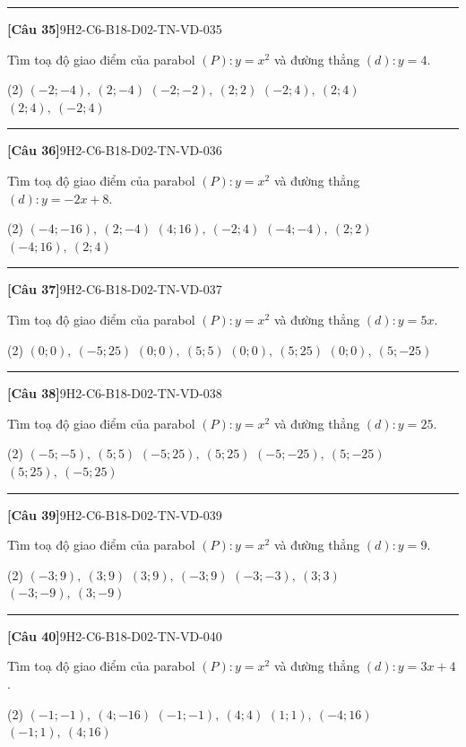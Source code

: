 \documentclass[12pt,a4paper]{article}
\newif\ifloigiai
\newenvironment{cauhoi}[2]{%
  \par\medskip\noindent\rule{\textwidth}{0.4pt}\par\nopagebreak
  \noindent\textbf{[#1]}\hfill{\scriptsize\ttfamily #2}\par\nopagebreak\smallskip}{\par}
\newcommand{\dapan}[1]{\ifloigiai\par\smallskip\noindent\textit{Đáp án:} \textbf{#1}\par\fi}
\begin{document}
\begin{cauhoi}{Câu 35}{9H2-C6-B18-D02-TN-VD-035}
Tìm toạ độ giao điểm của parabol $(P): y=x^{2}$ và đường thẳng $(d): y=4$.
\begin{tasks}(2)
\task $(-2;-4),\ (2;-4)$
\task $(-2;-2),\ (2;2)$
\task $(-2;4),\ (2;4)$
\task $(2;4),\ (-2;4)$
\end{tasks}
\dapan{C}
\end{cauhoi}
\begin{cauhoi}{Câu 36}{9H2-C6-B18-D02-TN-VD-036}
Tìm toạ độ giao điểm của parabol $(P): y=x^{2}$ và đường thẳng $(d): y=-2x+8$.
\begin{tasks}(2)
\task $(-4;-16),\ (2;-4)$
\task $(4;16),\ (-2;4)$
\task $(-4;-4),\ (2;2)$
\task $(-4;16),\ (2;4)$
\end{tasks}
\dapan{D}
\end{cauhoi}
\begin{cauhoi}{Câu 37}{9H2-C6-B18-D02-TN-VD-037}
Tìm toạ độ giao điểm của parabol $(P): y=x^{2}$ và đường thẳng $(d): y=5x$.
\begin{tasks}(2)
\task $(0;0),\ (-5;25)$
\task $(0;0),\ (5;5)$
\task $(0;0),\ (5;25)$
\task $(0;0),\ (5;-25)$
\end{tasks}
\dapan{C}
\end{cauhoi}
\begin{cauhoi}{Câu 38}{9H2-C6-B18-D02-TN-VD-038}
Tìm toạ độ giao điểm của parabol $(P): y=x^{2}$ và đường thẳng $(d): y=25$.
\begin{tasks}(2)
\task $(-5;-5),\ (5;5)$
\task $(-5;25),\ (5;25)$
\task $(-5;-25),\ (5;-25)$
\task $(5;25),\ (-5;25)$
\end{tasks}
\dapan{B}
\end{cauhoi}
\begin{cauhoi}{Câu 39}{9H2-C6-B18-D02-TN-VD-039}
Tìm toạ độ giao điểm của parabol $(P): y=x^{2}$ và đường thẳng $(d): y=9$.
\begin{tasks}(2)
\task $(-3;9),\ (3;9)$
\task $(3;9),\ (-3;9)$
\task $(-3;-3),\ (3;3)$
\task $(-3;-9),\ (3;-9)$
\end{tasks}
\dapan{A}
\end{cauhoi}
\begin{cauhoi}{Câu 40}{9H2-C6-B18-D02-TN-VD-040}
Tìm toạ độ giao điểm của parabol $(P): y=x^{2}$ và đường thẳng $(d): y=3x+4$.
\begin{tasks}(2)
\task $(-1;-1),\ (4;-16)$
\task $(-1;-1),\ (4;4)$
\task $(1;1),\ (-4;16)$
\task $(-1;1),\ (4;16)$
\end{tasks}
\dapan{D}
\end{cauhoi}
\end{document}
